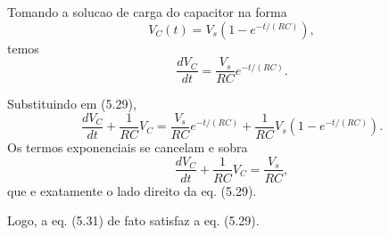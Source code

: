 Tomando a solucao de carga do capacitor na forma
\[
V_C(t)=V_s\left(1-e^{-t/(RC)}\right),
\]
temos
\[
\frac{dV_C}{dt}=\frac{V_s}{RC}e^{-t/(RC)}.
\]

Substituindo em (5.29),
\[
\frac{dV_C}{dt}+\frac{1}{RC}V_C
=\frac{V_s}{RC}e^{-t/(RC)}+\frac{1}{RC}V_s\left(1-e^{-t/(RC)}\right).
\]
Os termos exponenciais se cancelam e sobra
\[
\frac{dV_C}{dt}+\frac{1}{RC}V_C=\frac{V_s}{RC},
\]
que e exatamente o lado direito da eq. (5.29).

Logo, a eq. (5.31) de fato satisfaz a eq. (5.29).